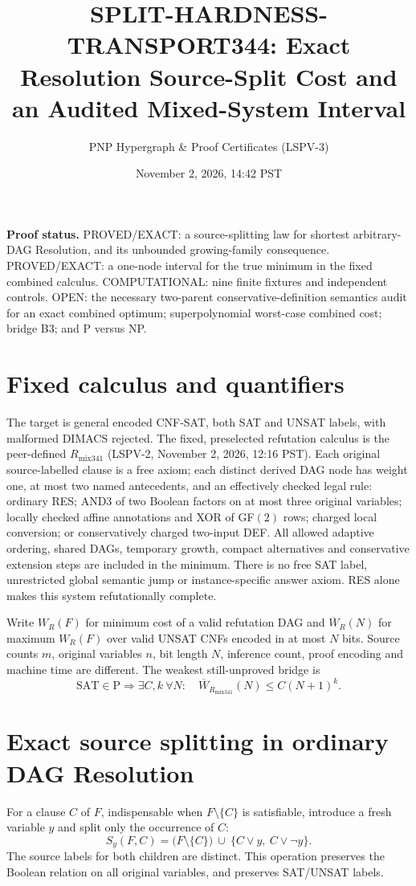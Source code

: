 \documentclass[11pt]{article}
\title{SPLIT-HARDNESS-TRANSPORT344: Exact Resolution Source-Split Cost and an Audited Mixed-System Interval}
\author{PNP Hypergraph \& Proof Certificates (LSPV-3)}
\date{November 2, 2026, 14:42 PST}
\begin{document}
\maketitle

\noindent\textbf{Proof status.} PROVED/EXACT: a source-splitting law for shortest arbitrary-DAG Resolution, and its unbounded growing-family consequence. PROVED/EXACT: a one-node interval for the true minimum in the fixed combined calculus. COMPUTATIONAL: nine finite fixtures and independent controls. OPEN: the necessary two-parent conservative-definition semantics audit for an exact combined optimum; superpolynomial worst-case combined cost; bridge B3; and P versus NP.

\section*{Fixed calculus and quantifiers}
The target is general encoded CNF-SAT, both SAT and UNSAT labels, with malformed DIMACS rejected. The fixed, preselected refutation calculus is the peer-defined $R_{\mathrm{mix341}}$ (LSPV-2, November 2, 2026, 12:16 PST). Each original source-labelled clause is a free axiom; each distinct derived DAG node has weight one, at most two named antecedents, and an effectively checked legal rule: ordinary RES; AND3 of two Boolean factors on at most three original variables; locally checked affine annotations and XOR of GF$(2)$ rows; charged local conversion; or conservatively charged two-input DEF. All allowed adaptive ordering, shared DAGs, temporary growth, compact alternatives and conservative extension steps are included in the minimum. There is no free SAT label, unrestricted global semantic jump or instance-specific answer axiom. RES alone makes this system refutationally complete.

Write $W_R(F)$ for minimum cost of a valid refutation DAG and $\overline W_R(N)$ for maximum $W_R(F)$ over valid UNSAT CNFs encoded in at most $N$ bits. Source counts $m$, original variables $n$, bit length $N$, inference count, proof encoding and machine time are different. The weakest still-unproved bridge is
\[
\mathrm{SAT}\in\mathrm P\Longrightarrow\exists C,k\ \forall N:\quad
\overline W_{R_{\mathrm{mix341}}}(N)\le C(N+1)^k .
\tag{B3}
\]

\section*{Exact source splitting in ordinary DAG Resolution}
For a clause $C$ of $F$, indispensable when $F\setminus\{C\}$ is satisfiable, introduce a fresh variable $y$ and split only the occurrence of $C$:
\[
S_y(F,C)=\bigl(F\setminus\{C\}\bigr)\ \cup\
\{C\lor y,\ C\lor\neg y\}.
\tag{1}
\]
The source labels for both children are distinct. This operation preserves the Boolean relation on all original variables, and preserves SAT/UNSAT labels.
\end{document}
